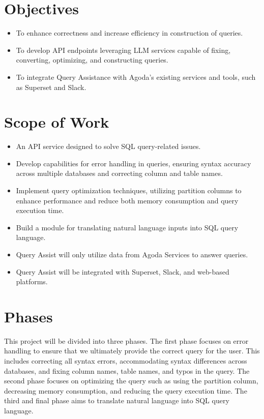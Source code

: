 \section{Objectives}
\begin{itemize}
  \item To enhance correctness and increase efficiency in construction of queries.
  \item To develop API endpoints leveraging LLM services capable of fixing, converting, optimizing, and constructing queries.
  \item To integrate Query Assistance with Agoda's existing services and tools, such as Superset and Slack.
\end{itemize}


\pagebreak
\section{Scope of Work}
\begin{itemize}
  \item An API service designed to solve SQL query-related issues.
  \item Develop capabilities for error handling in queries, ensuring syntax accuracy across multiple databases and correcting column and table names.
  \item Implement query optimization techniques, utilizing partition columns to enhance performance and reduce both memory consumption and query execution time.
  \item Build a module for translating natural language inputs into SQL query language.
  \item Query Assist will only utilize data from Agoda Services to answer queries.
  \item Query Assist will be integrated with Superset, Slack, and web-based platforms.
\end{itemize}

\section{Phases}
This project will be divided into three phases. The first phase focuses on error handling to ensure that we ultimately provide the correct query for the user. This includes correcting all syntax errors, accommodating syntax differences across databases, and fixing column names, table names, and typos in the query. The second phase focuses on optimizing the query such as using the partition column, decreasing memory consumption, and reducing the query execution time. The third and final phase aims to translate natural language into SQL query language.

